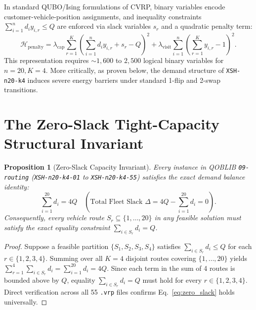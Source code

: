 \documentclass[10pt,a4paper]{article}
\newtheorem{proposition}{Proposition}
\begin{document}
In standard QUBO/Ising formulations of CVRP, binary variables encode customer-vehicle-position assignments, and inequality constraints $\sum_{i=1}^n d_i y_{i,r} \le Q$ are enforced via slack variables $s_r$ and a quadratic penalty term:
\begin{equation}
  \mathcal{H}_{\text{penalty}} = \lambda_{\text{cap}} \sum_{r=1}^{K} \left( \sum_{i=1}^{n} d_i y_{i,r} + s_r - Q \right)^2 + \lambda_{\text{visit}} \sum_{i=1}^{n} \left( \sum_{r=1}^{K} y_{i,r} - 1 \right)^2.
  \label{eq:qubo_penalty}
\end{equation}
This representation requires $\sim 1,600$ to $2,500$ logical binary variables for $n=20, K=4$. More critically, as proven below, the demand structure of \texttt{XSH-n20-k4} induces severe energy barriers under standard 1-flip and 2-swap transitions.

\section{The Zero-Slack Tight-Capacity Structural Invariant}

\begin{proposition}[Zero-Slack Capacity Invariant]
Every instance in QOBLIB \texttt{09-routing} (\texttt{XSH-n20-k4-01} to \texttt{XSH-n20-k4-55}) satisfies the exact demand balance identity:
\begin{equation}
  \sum_{i=1}^{20} d_i = 4 Q \quad \left(\text{Total Fleet Slack } \Delta = 4Q - \sum_{i=1}^{20} d_i = 0\right).
  \label{eq:zero_slack}
\end{equation}
Consequently, every vehicle route $S_r \subseteq \{1,\dots,20\}$ in any feasible solution must satisfy the exact equality constraint $\sum_{i \in S_r} d_i = Q$.
\end{proposition}

\begin{proof}
Suppose a feasible partition $\{S_1, S_2, S_3, S_4\}$ satisfies $\sum_{i \in S_r} d_i \le Q$ for each $r \in \{1,2,3,4\}$. Summing over all $K=4$ disjoint routes covering $\{1,\dots,20\}$ yields $\sum_{r=1}^4 \sum_{i \in S_r} d_i = \sum_{i=1}^{20} d_i = 4Q$. Since each term in the sum of 4 routes is bounded above by $Q$, equality $\sum_{i \in S_r} d_i = Q$ must hold for every $r \in \{1,2,3,4\}$. Direct verification across all 55 \texttt{.vrp} files confirms Eq.~\eqref{eq:zero_slack} holds universally.
\end{proof}
\end{document}
